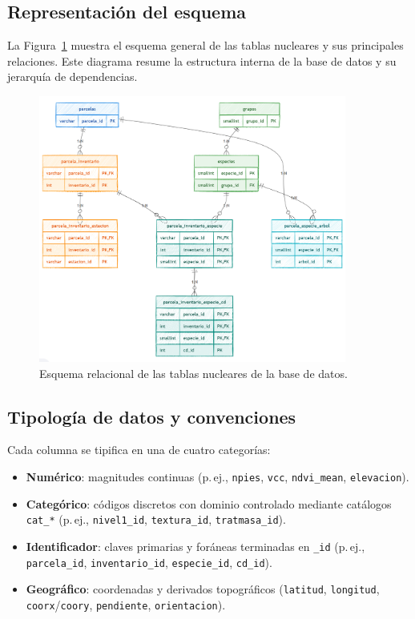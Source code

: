 \subsection*{Representación del esquema}

La Figura~\ref{fig:GWest_BBDD} muestra el esquema general de las tablas nucleares y sus principales relaciones. Este diagrama resume la estructura interna de la base de datos y su jerarquía de dependencias.

\begin{figure}[H]
  \centering
  \includegraphics[width=0.9\textwidth]{figuras/Estrctr_BBDD_GWest.png}
  \caption{Esquema relacional de las tablas nucleares de la base de datos.}
  \label{fig:GWest_BBDD}
\end{figure}

\subsection*{Tipología de datos y convenciones}

Cada columna se tipifica en una de cuatro categorías:
\begin{itemize}
  \item \textbf{Numérico}: magnitudes continuas (p.\,ej., \texttt{npies}, \texttt{vcc}, \texttt{ndvi\_mean}, \texttt{elevacion}).
  \item \textbf{Categórico}: códigos discretos con dominio controlado mediante catálogos \texttt{cat\_*} (p.\,ej., \texttt{nivel1\_id}, \texttt{textura\_id}, \texttt{tratmasa\_id}).
  \item \textbf{Identificador}: claves primarias y foráneas terminadas en \texttt{\_id} (p.\,ej., \texttt{parcela\_id}, \texttt{inventario\_id}, \texttt{especie\_id}, \texttt{cd\_id}).
  \item \textbf{Geográfico}: coordenadas y derivados topográficos (\texttt{latitud}, \texttt{longitud}, \texttt{coorx}/\texttt{coory}, \texttt{pendiente}, \texttt{orientacion}).
\end{itemize}

